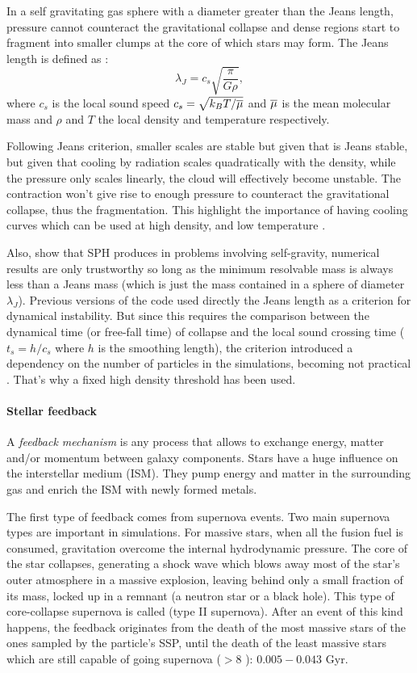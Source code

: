 In a self gravitating gas sphere with a diameter greater than the Jeans length, pressure cannot counteract the gravitational collapse and dense regions start to fragment into smaller clumps at the core of which stars may form.
The Jeans length is defined as \citep{Jeans1902}:
\begin{equation}
 \lambda_J = c_s\sqrt{\frac{\pi}{G \rho}},
\end{equation}
where $c_s$ is the local sound speed $c_s=\sqrt{k_BT/\overline{\mu}}$ and $\overline{\mu}$ is the mean molecular mass and $\rho$ and $T$ the local density and temperature respectively.

Following Jeans criterion, smaller scales are stable but given that is Jeans stable, but given that cooling by radiation scales quadratically with the density, while the pressure only scales linearly, the cloud will effectively become unstable.
The contraction won't give rise to enough pressure to counteract the gravitational collapse, thus the fragmentation.
This highlight the importance of having cooling curves which can be used at high density, and low temperature \citep{DeRijcke2013}.

Also, \citet{Bate1997} show that SPH produces in problems involving self-gravity, numerical results are only trustworthy so long as the minimum resolvable mass is always less than a Jeans mass (which is just the mass contained in a sphere of diameter $\lambda_J$).
Previous versions of the code used directly the Jeans length as a criterion for dynamical instability.
But since this requires the comparison between the dynamical time (or free-fall time) of collapse and the local sound crossing time ($t_s = h/c_s$ where $h$ is the smoothing length), the criterion introduced a dependency on the number of particles in the simulations, becoming not practical \citep{Valcke2008, Stinson2006}. That's why a fixed high density threshold has been used.

\paragraph{Stellar feedback}
A \emph{feedback mechanism} is any process that allows to exchange energy, matter and/or momentum between galaxy components. Stars have a huge influence on the interstellar medium (ISM). They pump energy and matter in the surrounding gas and enrich the ISM with newly formed metals.

The first type of feedback comes from supernova events. Two main supernova types are important in simulations. For massive stars, when all the fusion fuel is consumed, gravitation overcome the internal hydrodynamic pressure. The core of the star collapses, generating a shock wave which blows away most of the star's outer atmosphere in a massive explosion, leaving behind only a small fraction of its mass, locked up in a remnant (a neutron star or a black hole). This type of core-collapse supernova is called \snii{} (type II supernova).
After an event of this kind happens, the feedback originates from the death of the most massive stars of the ones sampled by the particle's SSP, until the death of the least massive stars which are still capable of going supernova ($>8$ \Msun ): $0.005 - 0.043$ Gyr.


